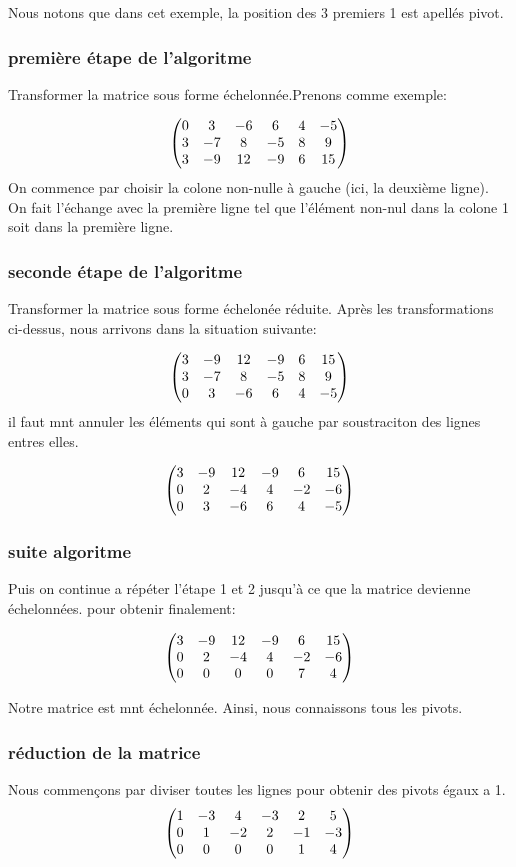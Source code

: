 \documentclass[a4paper,10pt]{article}
\begin{document}
Nous notons que dans cet exemple, la position des 3 premiers 1 est apellés pivot.
\subsubsection{première étape de l'algoritme}
Transformer la matrice sous forme échelonnée.Prenons comme exemple:

\[
\begin{pmatrix}%
 0&3&-6&6&4&-5\cr
 3&-7&8&-5&8&9\cr
 3&-9&12&-9&6&15
 \end{pmatrix}
\]
 On commence par choisir la colone  non-nulle à gauche (ici, la deuxième ligne). On fait l'échange avec la première ligne tel que l'élément non-nul dans la colone 1 soit dans la première ligne.
 
\subsubsection{seconde étape de l'algoritme}
Transformer la matrice sous forme échelonée réduite. Après les transformations ci-dessus, nous  arrivons dans la situation suivante:

\[
\begin{pmatrix}%
 3&-9&12&-9&6&15\cr
 3&-7&8&-5&8&9\cr
 0&3&-6&6&4&-5
 \end{pmatrix}
\]
il faut mnt annuler les éléments qui sont à gauche par soustraciton des lignes entres elles.

\[
\begin{pmatrix}%
 3&-9&12&-9&6&15\cr
 0&2&-4&4&-2&-6\cr
 0&3&-6&6&4&-5
 \end{pmatrix}
\]
\subsubsection{suite algoritme}

Puis on continue a répéter l'étape 1 et 2 jusqu'à ce que la matrice devienne échelonnées. pour obtenir finalement:

\[
\begin{pmatrix}%
 3&-9&12&-9&6&15\cr
 0&2&-4&4&-2&-6\cr
 0&0&0&0&7&4
 \end{pmatrix}
\]

Notre matrice est mnt échelonnée. Ainsi, nous connaissons tous les pivots.
\subsubsection{réduction de la matrice}
 Nous commençons par diviser toutes les lignes pour obtenir des pivots égaux a 1.
 \[
\begin{pmatrix}%
 1&-3&4&-3&2&5\cr
 0&1&-2&2&-1&-3\cr
 0&0&0&0&1&4
 \end{pmatrix}
\]
 
\end{document}
